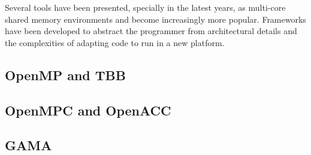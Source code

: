 \documentclass[../thesis]{subfiles}
\begin{document}
		Several tools have been presented, specially in the latest years, as multi-core shared memory environments and \hetplats become increasingly more popular. Frameworks have been developed to abstract the programmer from architectural details and the complexities of adapting code to run in a new platform.

		\subsection{OpenMP and TBB}
		\subsection{OpenMPC and OpenACC}
		\subsection{GAMA}
\end{document}
